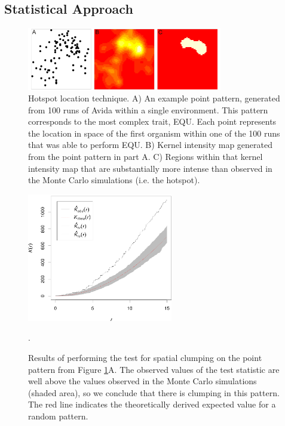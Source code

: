 \documentclass[letterpaper]{article}
\begin{document}
\subsection{Statistical Approach}

\begin{figure}
\begin{center}
\includegraphics[width=3.35in]{figs/statsfig_horziontal_1col.png}
\caption{Hotspot location technique. A) An example point pattern, generated from 100 runs of Avida within a single environment. This pattern corresponds to the most complex trait, EQU. Each point represents the location in space of the first organism within one of the 100 runs that was able to perform EQU. B) Kernel intensity map generated from the point pattern in part A. C) Regions within that kernel intensity map that are substantially more intense than observed in the Monte Carlo simulations (i.e. the hotspot).}
\label{stats}
\end{center}
\end{figure}
\begin{figure}[t]
\begin{center}
\includegraphics[width=2.5in]{figs/9_50013_k-hat.png}
\caption{Results of performing the test for spatial clumping on the point pattern from Figure \ref{stats}A. The observed values of the test statistic are well above the values observed in the Monte Carlo simulations (shaded area), so we conclude that there is clumping in this pattern. The red line indicates the theoretically derived expected value for a random pattern.}. 
\label{khat}
\end{center}
\end{figure}
\end{document}
